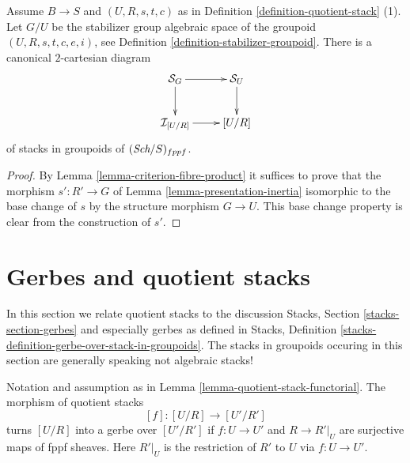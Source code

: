 \begin{lemma}
\label{lemma-2-cartesian-inertia}
Assume $B \to S$ and $(U, R, s, t, c)$ as in
Definition \ref{definition-quotient-stack} (1).
Let $G/U$ be the stabilizer group algebraic space of the groupoid
$(U, R, s, t, c, e, i)$, see
Definition \ref{definition-stabilizer-groupoid}.
There is a canonical $2$-cartesian diagram
$$
\xymatrix{
\mathcal{S}_G \ar[r] \ar[d] & \mathcal{S}_U \ar[d] \\
\mathcal{I}_{[U/R]} \ar[r] & [U/R]
}
$$
of stacks in groupoids of $(\textit{Sch}/S)_{fppf}$.
\end{lemma}

\begin{proof}
By
Lemma \ref{lemma-criterion-fibre-product}
it suffices to prove that the morphism
$s' : R' \to G$ of
Lemma \ref{lemma-presentation-inertia}
isomorphic to the base change of $s$ by the structure
morphism $G \to U$. This base change property is
clear from the construction of $s'$.
\end{proof}







\section{Gerbes and quotient stacks}
\label{section-gerbes}

\noindent
In this section we relate quotient stacks to the discussion
Stacks, Section \ref{stacks-section-gerbes}
and especially gerbes as defined in
Stacks, Definition \ref{stacks-definition-gerbe-over-stack-in-groupoids}.
The stacks in groupoids occuring in this section
are generally speaking not algebraic stacks!

\begin{lemma}
\label{lemma-when-gerbe}
Notation and assumption as in
Lemma \ref{lemma-quotient-stack-functorial}.
The morphism of quotient stacks
$$
[f] : [U/R] \longrightarrow [U'/R']
$$
turns $[U/R]$ into a gerbe over $[U'/R']$ if $f : U \to U'$ and
$R \to R'|_U$ are surjective maps of fppf sheaves. Here $R'|_U$ is
the restriction of $R'$ to $U$ via $f : U \to U'$.
\end{lemma}

